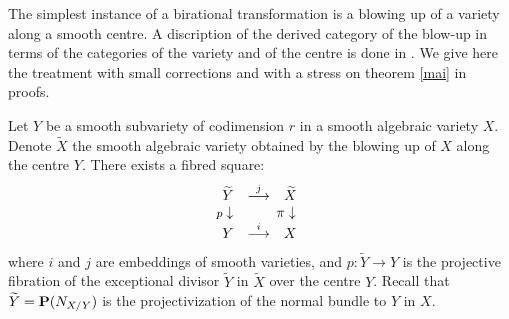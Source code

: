 \documentclass[12pt]{article}
\begin{document}
The simplest instance of a birational transformation is a blowing up of a variety along a smooth centre. A discription of the derived category of the blow-up in  terms of the categories of the variety and of the centre is done in \cite{or} . We give here the treatment with small corrections and with a stress on theorem \ref{mai} in proofs.

 

Let $Y$ be a smooth subvariety of codimension $r$ in a smooth algebraic variety $X$. Denote $\widetilde X$ the smooth algebraic variety obtained by the blowing up of $X$ along the centre $Y$.
There exists a fibred square:
$$
\begin{array}{ccc}
\widetilde Y&\stackrel{j }{\longrightarrow}& \widetilde X\\
\llap{\footnotesize $p$} \downarrow &&\llap{$\pi$} \downarrow\\
Y&\stackrel{i}{\longrightarrow}& X 
\end{array}
$$
where $i$ and $j$ are embeddings of smooth varieties, and $p: \widetilde Y\to Y$ is the projective fibration of the exceptional divisor $\widetilde Y$ in $\widetilde X$ over the centre $Y$. Recall that $\widetilde Y={\bf P}(N_{X/Y})$ is the projectivization of the normal bundle to $Y$ in $X$.
\end{document}
